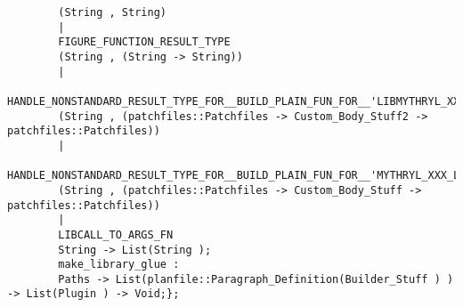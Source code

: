 \begin{verbatim}
        (String , String)
        |
        FIGURE_FUNCTION_RESULT_TYPE
        (String , (String -> String))
        |
        HANDLE_NONSTANDARD_RESULT_TYPE_FOR__BUILD_PLAIN_FUN_FOR__'LIBMYTHRYL_XXX_C'
        (String , (patchfiles::Patchfiles -> Custom_Body_Stuff2 -> patchfiles::Patchfiles))
        |
        HANDLE_NONSTANDARD_RESULT_TYPE_FOR__BUILD_PLAIN_FUN_FOR__'MYTHRYL_XXX_LIBRARY_IN_C_SUBPROCESS_C'
        (String , (patchfiles::Patchfiles -> Custom_Body_Stuff -> patchfiles::Patchfiles))
        |
        LIBCALL_TO_ARGS_FN
        String -> List(String );
        make_library_glue :
        Paths -> List(planfile::Paragraph_Definition(Builder_Stuff ) ) -> List(Plugin ) -> Void;};
\end{verbatim}
